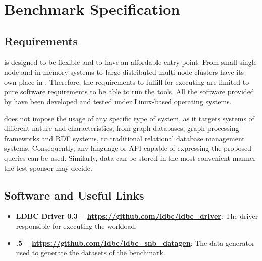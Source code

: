 \chapter{Benchmark Specification}
\label{section:benchmark-specification}

\section{Requirements}

\ldbcsnb is designed to be flexible and to have an affordable entry point.
From small single node and in memory systems to large distributed multi-node
clusters have its own place in \ldbcsnb.  Therefore, the requirements to
fulfill for executing \ldbcsnb are limited to pure software requirements to be
able to run the tools. All the software provided by \ldbcsnb have been
developed and tested under Linux-based operating systems.

\ldbcsnb does not impose the usage of any specific type of system, as it
targets systems of different nature and characteristics, from graph databases,
graph processing frameworks and RDF systems, to traditional relational database
management systems. Consequently, any language or API capable of expressing the
proposed queries can be used. Similarly, data can be stored in the most
convenient manner the test sponsor may decide.



\section{Software and Useful Links}

\begin{itemize}
	\item \textbf{LDBC Driver 0.3 -- \url{https://github.com/ldbc/ldbc_driver}}: The driver
	responsible for executing the \ldbcsnb workload.
	\item \textbf{.5 -- \url{https://github.com/ldbc/ldbc_snb_datagen}}: The data
	generator used to generate the datasets of the benchmark.
\end{itemize}

